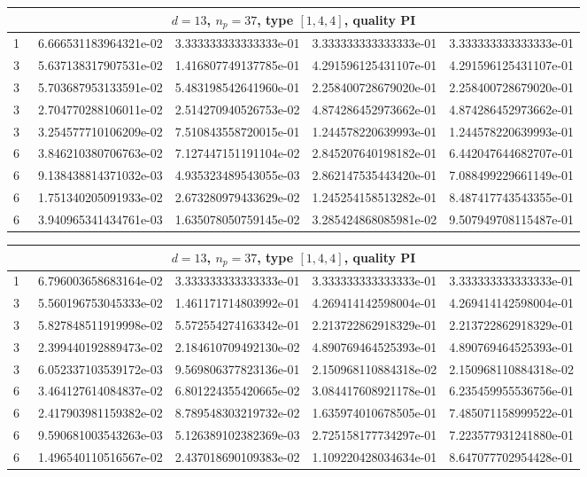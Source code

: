\documentclass{article}
\begin{document}
\begin{center}
\begin{tabular}{rrrrr}
\multicolumn{5}{c}{\rmfamily $d=13$, $n_p=37$, type $[1,4,4]$, quality PI}\\
\toprule
1 & ~6.666531183964321e-02 & 3.333333333333333e-01 & 3.333333333333333e-01 & 3.333333333333333e-01\\
3 & ~5.637138317907531e-02 & 1.416807749137785e-01 & 4.291596125431107e-01 & 4.291596125431107e-01\\
3 & ~5.703687953133591e-02 & 5.483198542641960e-01 & 2.258400728679020e-01 & 2.258400728679020e-01\\
3 & ~2.704770288106011e-02 & 2.514270940526753e-02 & 4.874286452973662e-01 & 4.874286452973662e-01\\
3 & ~3.254577710106209e-02 & 7.510843558720015e-01 & 1.244578220639993e-01 & 1.244578220639993e-01\\
6 & ~3.846210380706763e-02 & 7.127447151191104e-02 & 2.845207640198182e-01 & 6.442047644682707e-01\\
6 & ~9.138438814371032e-03 & 4.935323489543055e-03 & 2.862147535443420e-01 & 7.088499229661149e-01\\
6 & ~1.751340205091933e-02 & 2.673280979433629e-02 & 1.245254158513282e-01 & 8.487417743543355e-01\\
6 & ~3.940965341434761e-03 & 1.635078050759145e-02 & 3.285424868085981e-02 & 9.507949708115487e-01\\
\bottomrule
\end{tabular}
\bigskip

\begin{tabular}{rrrrr}
\multicolumn{5}{c}{\rmfamily $d=13$, $n_p=37$, type $[1,4,4]$, quality PI}\\
\toprule
1 & ~6.796003658683164e-02 & 3.333333333333333e-01 & 3.333333333333333e-01 & 3.333333333333333e-01\\
3 & ~5.560196753045333e-02 & 1.461171714803992e-01 & 4.269414142598004e-01 & 4.269414142598004e-01\\
3 & ~5.827848511919998e-02 & 5.572554274163342e-01 & 2.213722862918329e-01 & 2.213722862918329e-01\\
3 & ~2.399440192889473e-02 & 2.184610709492130e-02 & 4.890769464525393e-01 & 4.890769464525393e-01\\
3 & ~6.052337103539172e-03 & 9.569806377823136e-01 & 2.150968110884318e-02 & 2.150968110884318e-02\\
6 & ~3.464127614084837e-02 & 6.801224355420665e-02 & 3.084417608921178e-01 & 6.235459955536756e-01\\
6 & ~2.417903981159382e-02 & 8.789548303219732e-02 & 1.635974010678505e-01 & 7.485071158999522e-01\\
6 & ~9.590681003543263e-03 & 5.126389102382369e-03 & 2.725158177734297e-01 & 7.223577931241880e-01\\
6 & ~1.496540110516567e-02 & 2.437018690109383e-02 & 1.109220428034634e-01 & 8.647077702954428e-01\\
\bottomrule
\end{tabular}
\bigskip


\end{center}
\end{document}
